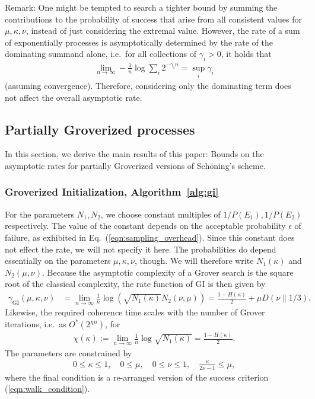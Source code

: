 \documentclass[a4paper,aps,floatfix]{revtex4}
\begin{document}
Remark:
One might be tempted to search a tighter bound by summing the contributions to the probability of success that arise from all consistent values for $\mu,\kappa,\nu$, instead of just considering the extremal value.
However, the rate of a sum of exponentially processes is asymptotically determined by the rate of the dominating summand alone, i.e.\ for all collections of $\gamma_i>0$, it holds that
\begin{align*}
	 \lim_{n\to\infty}-\frac1n \log \sum_i 2^{-\gamma_i n} = \sup_{i} \gamma_i
\end{align*}
(assuming convergence).
Therefore, considering only the dominating term does not affect the overall asymptotic rate.



\subsection{Partially Groverized processes}
\label{sec:analysis_grover}

In this section, we derive the main results of this paper:
Bounds on the asymptotic rates for partially Groverized versions of Sch\"oning's scheme.


\subsubsection{Groverized Initialization, Algorithm~\ref{alg:gi}}
\label{sec:gi}

For the parameters $N_1, N_2$, we choose constant multiples of $1/P(E_1), 1/P(E_2)$ respectively.
The value of the constant depends on the acceptable probability $\epsilon$ of failure, as exhibited in Eq.~(\ref{eqn:sampling_overhead}).
Since this constant does not effect the rate, we will not specify it here.
The probabilities do depend essentially on the parameters $\mu,\kappa,\nu$, though. 
We will therefore write $N_1(\kappa)$ and $N_2(\mu,\nu)$.
Because the asymptotic complexity of a Grover search is the square root of the classical complexity,
the rate function of GI 
is then given by
\begin{align}\label{rateGI}
	\gamma_{\textrm{GI}}(\mu,\kappa,\nu) 
	&=  
	\lim_{n \rightarrow \infty}\frac1n \log \left(\sqrt{N_1(\kappa)}N_2(\nu,\mu)\right) 
	= 
	\frac{1 - H(\kappa)}2 
	+  
	\mu D(\nu \parallel 1/3). 
\end{align}
Likewise, the required coherence time scales with the number of Grover iterations, i.e.\ as $O^*(2^{\chi n})$, for
\begin{align}
    \chi(\kappa) 
		:=  \lim_{n \rightarrow \infty}\frac1n \log \sqrt{N_1(\kappa)}
		= \frac{1 - H(\kappa)}2.
\end{align}
The parameters are constrained by
\begin{equation}
	\label{constsGIGW}
	\begin{aligned}
			0 \le \kappa \le 1,
			\quad
			0 \le \mu,
			\quad
			0 \le \nu \le 1,
			\quad
			\frac{\kappa}{2\nu -1} \leq \mu,
	\end{aligned}
\end{equation}
where the final condition is a re-arranged version of the success criterion (\ref{eqn:walk_condition}).
\end{document}
